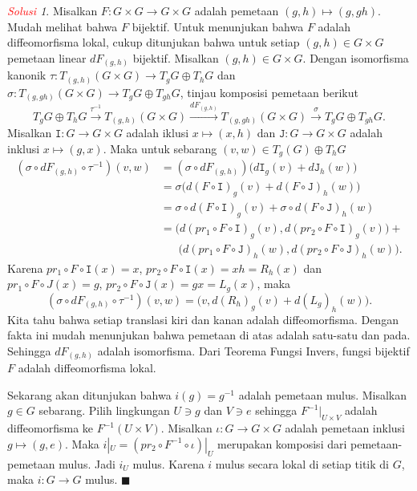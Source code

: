 \documentclass[11pt]{article}
\theoremstyle{definition}
\theoremstyle{remark}
\newtheorem*{solution}{\textcolor{red}{Solusi}}
\begin{document}
\begin{solution}
Misalkan $F : G \times G \to G \times G$ adalah pemetaan $(g,h) \mapsto (g,gh)$. Mudah melihat bahwa $F$ bijektif. Untuk menunjukan bahwa $F$ adalah diffeomorfisma lokal, cukup ditunjukan bahwa untuk setiap $(g,h)\in G \times G$ pemetaan linear $dF_{(g,h)}$ bijektif. Misalkan $(g,h) \in G \times G$.  Dengan isomorfisma kanonik $\tau : T_{(g,h)}(G \times G) \to T_gG \oplus T_hG$ dan $\sigma : T_{(g,gh)}(G \times G) \to T_gG \oplus T_{gh}G$, tinjau komposisi pemetaan berikut
$$
T_gG \oplus T_hG \xrightarrow{\tau^{-1}}  T_{(g,h)}(G \times G) \xrightarrow{dF_{(g,h)}} T_{(g,gh)}(G \times G) \xrightarrow{\sigma} T_gG \oplus T_{gh}G.
$$
Misalkan $\mathtt{I} : G \to G \times G$ adalah iklusi $x \mapsto (x,h)$ dan $\mathtt{J}: G \to G \times G$ adalah inklusi $x \mapsto (g,x)$. Maka untuk sebarang $(v,w) \in T_g(G) \oplus T_hG$
\begin{align*}
    (\sigma \circ dF_{(g,h)} \circ \tau^{-1}) (v,w) &= (\sigma \circ dF_{(g,h)}) \big( d\mathtt{I}_g(v)+ d\mathtt{J}_h(w) \big)  \\
    &= \sigma \big( d(F \circ \mathtt{I})_g(v) + d(F \circ \mathtt{J})_h(w) \big) \\
    &= \sigma \circ d(F \circ \mathtt{I})_g(v) + \sigma \circ d(F \circ \mathtt{J})_h(w) \\
    &= \Big( d(pr_1 \circ F \circ \mathtt{I})_g(v), d(pr_2 \circ F \circ \mathtt{I})_g(v) \Big) + \\
    &\phantom{=.} \Big( d(pr_1 \circ F \circ \mathtt{J})_h(w), d(pr_2 \circ F \circ \mathtt{J})_h(w) \Big).
\end{align*}
Karena $pr_1 \circ F \circ \mathtt{I}(x) = x$, $pr_2 \circ F \circ \mathtt{I}(x) = xh = R_h(x)$ dan $pr_1 \circ F \circ J(x) = g$, $pr_2 \circ F \circ \mathtt{J}(x) = gx = L_g(x)$, maka
$$
 (\sigma \circ dF_{(g,h)} \circ \tau^{-1}) (v,w) =  \big( v , d(R_h)_g(v) +  d(L_g)_h(w) \big).
$$
Kita tahu bahwa setiap translasi kiri dan kanan adalah diffeomorfisma. Dengan fakta ini mudah menunjukan bahwa pemetaan di atas adalah satu-satu dan pada. Sehingga $dF_{(g,h)}$ adalah isomorfisma. Dari Teorema Fungsi Invers, fungsi bijektif $F$ adalah diffeomorfisma lokal. 

Sekarang akan ditunjukan bahwa $i(g) = g^{-1}$ adalah pemetaan mulus. Misalkan $g \in G$ sebarang. Pilih lingkungan $U \ni g$ dan  $V \ni e $ sehingga $F^{-1}|_{U \times V} $ adalah diffeomorfisma ke $F^{-1}(U \times V)$. Misalkan $\iota : G \to G \times G$ adalah pemetaan inklusi $g \mapsto (g,e)$. Maka  $i|_U = (pr_2 \circ F^{-1} \circ \iota)|_U$ merupakan komposisi dari pemetaan-pemetaan mulus. Jadi $i_U$ mulus. Karena $i$ mulus secara lokal di setiap titik di $G$, maka $i : G \to G$ mulus. $\blacksquare$
\end{solution}
\end{document}
